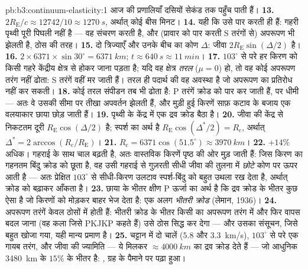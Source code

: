 \begin{solution}{pb:b3:continuum-elasticity:1}
आज की प्रणालियाँ दसियों सेकंड तक पहुँच पाती हैं।
\textbf{13.} $2R_{\text{E}}/c \approx 12742/10 \approx \qty{1270}{s}$,
अर्थात् कोई बीस मिनट।
\textbf{14.} यही कि  उसे पार करती ही हैं: गहरी पृथ्वी
पूरी पिघली नहीं है --- वह संचरण करती है, और (प्रावार को पार करती
S तरंगों से) अपरूपण भी झेलती है, ठोस की तरह।
\textbf{15.} दो त्रिज्याएँ और उनके बीच का कोण $\Delta$: जीवा
$2R_{\text{E}}\sin(\Delta/2)$ है।
\textbf{16.} $2 \times 6371 \times \sin30^\circ = \qty{6371}{km}$;
$t \approx \qty{640}{s} \approx \qty{11}{min}$।
\textbf{17.} $103^\circ$ से परे हर किरण को किसी गहरे केंद्रीय क्षेत्र
से होकर जाना पड़ता है; यदि वह क्षेत्र \emph{तरल} ($\mu = 0$) हो, तो वह
कोई अपरूपण तरंग नहीं ढोता: S तरंगें वहीं मर जाती हैं। तरल ही पदार्थ की
वह अवस्था है जो अपरूपण का प्रतिरोध नहीं कर सकती।
\textbf{18.} कोई तरल संपीडन तब भी ढोता है: P तरंगें क्रोड को पार कर
जाती हैं, पर धीमी --- अतः वे उसकी सीमा पर तीखा अपवर्तन झेलती हैं, और
मुड़ी हुई किरणें साफ़ कटाव के बजाय एक वलयाकार छाया छोड़ जाती हैं।
\textbf{19.} पृथ्वी के केंद्र में एक द्रव क्रोड बैठा है।
\textbf{20.} जीवा की केंद्र से निकटतम दूरी
$R_{\text{E}}\cos(\Delta/2)$ है; स्पर्श का अर्थ है
$R_{\text{E}}\cos(\Delta^*/2) = R_{\text{c}}$, अर्थात् $\Delta^* =
2\arccos(R_{\text{c}}/R_{\text{E}})$।
\textbf{21.} $R_{\text{c}} = 6371\cos(51.5^\circ) \approx
\qty{3970}{km}$।
\textbf{22.} $+14\%$ अधिक। गहराई के साथ चाल बढ़ती है, अतः वास्तविक
किरणें पृष्ठ की ओर मुड़ जाती हैं: जिस किरण का गहनतम बिंदु क्रोड को छूता
है, वह उसी गहराई से गुज़रती सीधी जीवा की तुलना में \emph{छोटे} कोण पर
ऊपर आती है --- अतः प्रेक्षित $103^\circ$ से सीधी-किरण उलटाव स्पर्श-बिंदु
को बहुत उथला रख देता है, अर्थात् क्रोड को बढ़ाकर आँकता है।
\textbf{23.} छाया के भीतर क्षीण P ऊर्जा का अर्थ है कि द्रव क्रोड के
भीतर कुछ ऐसा है जो किरणों को मोड़कर बाहर भेज देता है: एक अलग
\emph{भीतरी क्रोड} (लेमान, 1936)।
\textbf{24.} अपरूपण तरंगें केवल ठोसों में होती हैं: भीतरी क्रोड के भीतर
किसी  का अपरूपण तरंग में और फिर वापस बदल जाना (वह कला जिसे PKJKP
कहते हैं) उसे ठोस सिद्ध कर देगा --- और उसका संसूचन, जिसे बहुत खोजा गया,
यही मान्य प्रमाण है।
\textbf{25.} चट्टान में दो चालें ($5.8$ और \qty{3.3}{km/s}),
$103^\circ$ से परे एक गायब तरंग, और जीवा की ज्यामिति --- ये मिलकर
$\approx\qty{4000}{km}$ का द्रव क्रोड देते हैं --- जो आधुनिक
\qty{3480}{km} के $15\%$ के भीतर है: , ग्रह के पैमाने पर पढ़ा हुआ।
\end{solution}
